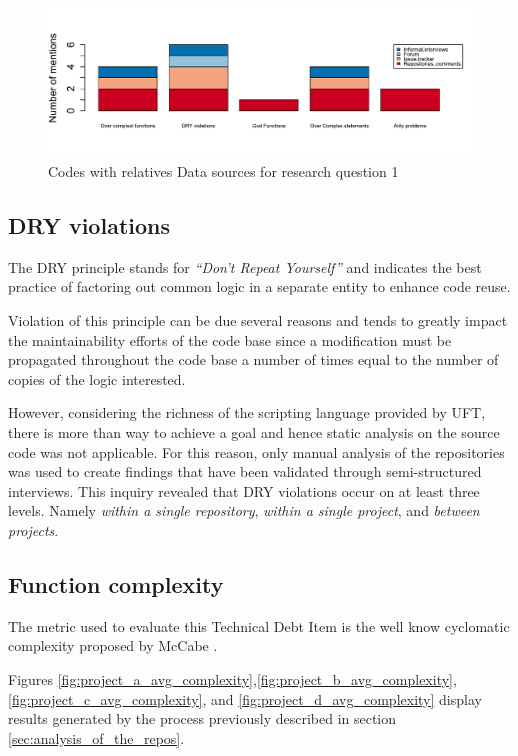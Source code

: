 \begin{figure}[!htbp]
    \centering
    \includegraphics[width=\textwidth,keepaspectratio]{figure/results/rq1/sources.pdf}
    \caption{Codes with relatives Data sources for research question 1}
    \label{fig:rq1_sources}
\end{figure}



\subsection{DRY violations}
The DRY principle stands for \textit{``Don't Repeat Yourself''} and indicates the best practice of factoring out common logic in a separate entity to enhance code reuse.

Violation of this principle can be due several reasons and tends to greatly impact the maintainability efforts of the code base since a modification must be propagated throughout the code base a number of times equal to the number of copies of the logic interested.

However, considering the richness of the scripting language provided by UFT, there is more than way to achieve a goal and hence static analysis on the source code was not applicable. For this reason, only manual analysis of the repositories was used to create findings that have been validated through semi-structured interviews. This inquiry revealed that DRY violations occur on at least three levels. Namely \textit{within a single repository}, \textit{within a single project}, and \textit{between projects}.


\subsection{Function complexity}
The metric used to evaluate this Technical Debt Item is the well know cyclomatic complexity proposed by McCabe \cite{cyclomatic_complexity}.


    Figures \ref{fig:project_a_avg_complexity},\ref{fig:project_b_avg_complexity},\ref{fig:project_c_avg_complexity}, and \ref{fig:project_d_avg_complexity} display results generated by the process previously described in section \ref{sec:analysis_of_the_repos}.

